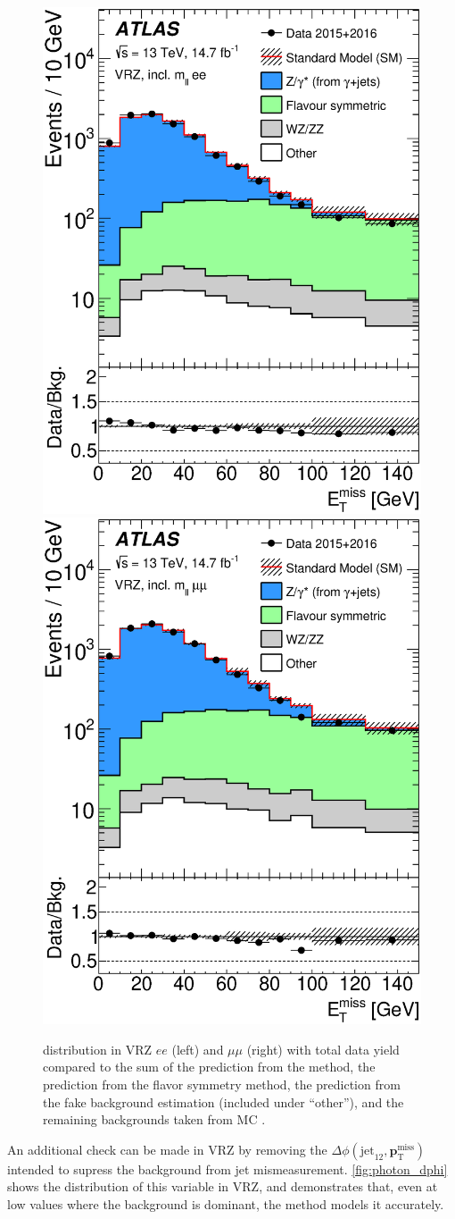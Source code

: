\begin{centering}
\begin{figure}[!hbt]
\myfloatalign
\includegraphics[width=.45\linewidth]{figures/photons/MET_azmet_ee.eps}
\includegraphics[width=.45\linewidth]{figures/photons/MET_azmet_mm.eps}
\caption{\MET distribution in VRZ $ee$ (left) and $\mu\mu$ (right) with total data yield compared to the sum of the prediction from the \gjets method, the prediction from the flavor symmetry method, the prediction from the fake background estimation (included under ``other''), and the remaining backgrounds taken from \ac{MC} \cite{this_paper}.}
\label{fig:photon_validation}
\end{figure}
\end{centering}

An additional check can be made in VRZ by removing the $\Delta\phi(\text{jet}_{12},{\boldsymbol p}_{\mathrm{T}}^\mathrm{miss})$ intended to supress the \dyjets background from jet mismeasurement. \autoref{fig:photon_dphi} shows the distribution of this variable in VRZ, and demonstrates that, even at low values where the \dyjets background is dominant, the \gjets method models it accurately.

